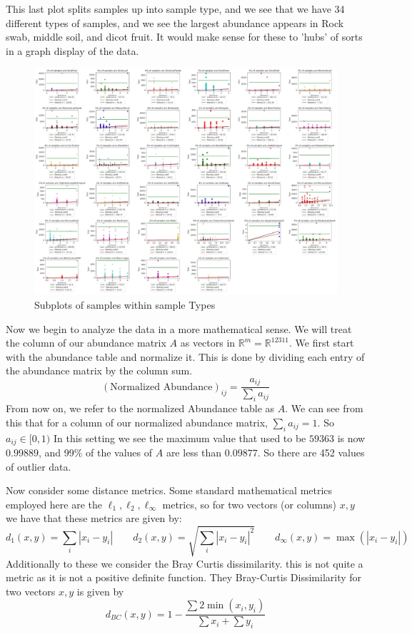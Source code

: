 \documentclass{article}
\newcommand{\R}{\mathbb{R}}
\theoremstyle{definition} \newtheorem*{lte}{Definition}
\theoremstyle{plain} \newtheorem*{csbt}{Theorem}
\begin{document}
This last plot splits samples up into sample type, and we see that we have 34 different types of samples, and we see the largest abundance appears in Rock swab, middle soil, and dicot fruit. It would make sense for these to 'hubs' of sorts in a graph display of the data. 
\begin{figure}[H]
\begin{center}

  \includegraphics[width=\linewidth]{sampleType.png}
  \caption{Subplots of samples within sample Types}
  \label{fig:samplletype}
  \end{center}

\end{figure}

Now we begin to analyze the data in a more mathematical sense. We will treat the column of our abundance matrix $A$ as vectors in $\R^m = \R^{12311}$. We first start with the abundance table and normalize it. This is done by dividing each entry of the abundance matrix by the column sum. 
$$(\text{Normalized Abundance})_{ij} = \frac{ a_{ij}}{\sum_i a_{ij}}$$
From now on, we refer to the normalized Abundance table as $A$. We can see from this that for a column of our normalized abundance matrix, $\sum_i a_{ij} = 1$. So $a_{ij} \in [0, 1)$ In this setting we see the maximum value that used to be $59363$ is now $0.99889$, and 99$\%$ of the values of $A$ are less than $0.09877$. So there are 452 values of outlier data. 

Now consider some distance metrics. Some standard mathematical metrics employed here are the $\ell_1, \ell_2, \ell_\infty$ metrics, so for two vectors (or columns) $x, y$ we have that these metrics are given by: 
$$ d_1(x,y) = \sum_i |x_i - y_i| \qquad d_2(x,y) = \sqrt{\sum_i|x_i - y_i|^2} \qquad d_\infty(x, y) = \max(|x_i - y_i|)$$
Additionally to these we consider the Bray Curtis dissimilarity. this is not quite a metric as it is not a positive definite function. They Bray-Curtis Dissimilarity for two vectors $x, y$ is given by 
$$d_{BC}(x,y) = 1 - \frac{\sum 2\min(x_i, y_i)}{\sum x_i + \sum y_i}$$
\end{document}

